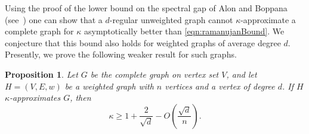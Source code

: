 \documentclass[12pt]{article}
\newtheorem{proposition}[theorem]{Proposition}
\def\bigO#1{{{O}}\left( #1 \right) }
\begin{document}
Using the proof of the lower bound on the spectral gap
  of Alon and Boppana (see~\cite{Nilli}) one can show that a $d$-regular
  unweighted graph cannot $\kappa$-approximate a complete graph for
  $\kappa$ asymptotically better than \eqref{eqn:ramanujanBound}.
We conjecture that this bound also holds for weighted graphs of average degree $d$.
Presently, we prove the following
  weaker result for such graphs.

\begin{proposition}\label{pro:lowerComplete}
Let $G$ be the complete graph on vertex set $V$,
  and let $H = (V,E,w)$ be a weighted graph with $n$ vertices and
  a vertex of degree $d$.
If $H$ $\kappa$-approximates $G$, then
\[
\kappa  
\geq 
1 + \frac{2}{\sqrt{d}} -
\bigO{\frac{\sqrt{d}}{n}}.
\]
\end{proposition}
\end{document}

